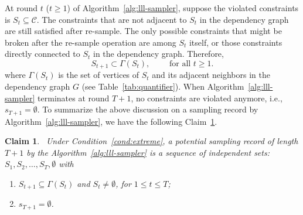\documentclass[letterpaper]{article} %
\newtheorem{claim}{Claim}
\begin{document}
At round $t$  ($t \geq 1$) of Algorithm~\ref{alg:lll-sampler}, suppose the violated constraints is $S_t\subseteq \mathcal{C}$. The constraints that are not adjacent to $S_t$ in the dependency graph are still satisfied after re-sample. The only possible constraints that might be broken after the re-sample operation are among $S_t$ itself, or those constraints directly connected to  $S_t$ in the dependency graph. Therefore,
\begin{equation*}
S_{t+1} \subset \Gamma(S_t),    \qquad \text{ for all } t\ge 1.
\end{equation*}
where $\Gamma(S_t)$ is the set of vertices of $S_t$ and its adjacent neighbors
in the dependency graph $G$ (see Table~\ref{tab:quantifier}).  When Algorithm~\ref{alg:lll-sampler} terminates at round $T+1$, no  constraints are violated anymore, i.e., $s_{T+1}=\emptyset$.  To summarize the above discussion on a sampling record by Algorithm~\ref{alg:lll-sampler}, we have the following Claim~\ref{claim:record}.
\begin{claim}~\label{claim:record}
Under Condition~\ref{cond:extreme}, a potential sampling record of length $T+1$ by the Algorithm~\ref{alg:lll-sampler} is a sequence of independent sets: $S_1, S_2, \ldots,S_T,\emptyset$ with 
\begin{enumerate}
    \item $S_{t+1} \subseteq \Gamma(S_{t})$ and $S_t\neq\emptyset$, for $1 \leq t\leq T$; 
    \item $s_{T+1}=\emptyset$.
\end{enumerate}
\end{claim}
\end{document}
